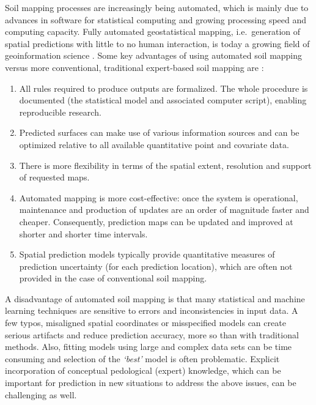 \documentclass[11pt]{krantz}
\theoremstyle{definition}
\theoremstyle{definition}
\theoremstyle{definition}
\theoremstyle{remark}
\begin{document}
Soil mapping processes are increasingly being automated, which is mainly
due to advances in software for statistical computing and growing
processing speed and computing capacity. Fully automated geostatistical
mapping, i.e.~generation of spatial predictions with little to no human
interaction, is today a growing field of geoinformation science
\citep{Pebesma2011CompGeoSci, Brown2014JSS, Hengl2014SoilGrids1km}. Some
key advantages of using automated soil mapping versus more conventional,
traditional expert-based soil mapping are
\citep{heuvelink2010implications, Bivand2013Springer}:

\begin{enumerate}
\def\labelenumi{\arabic{enumi}.}
\item
  All rules required to produce outputs are formalized. The whole
  procedure is documented (the statistical model and associated computer
  script), enabling reproducible research.
\item
  Predicted surfaces can make use of various information sources and can
  be optimized relative to all available quantitative point and
  covariate data.
\item
  There is more flexibility in terms of the spatial extent, resolution
  and support of requested maps.
\item
  Automated mapping is more cost-effective: once the system is
  operational, maintenance and production of updates are an order of
  magnitude faster and cheaper. Consequently, prediction maps can be
  updated and improved at shorter and shorter time intervals.
\item
  Spatial prediction models typically provide quantitative measures of
  prediction uncertainty (for each prediction location), which are often
  not provided in the case of conventional soil mapping.
\end{enumerate}

A disadvantage of automated soil mapping is that many statistical and
machine learning techniques are sensitive to errors and inconsistencies
in input data. A few typos, misaligned spatial coordinates or
misspecified models can create serious artifacts and reduce prediction
accuracy, more so than with traditional methods. Also, fitting models
using large and complex data sets can be time consuming and selection of
the \emph{`best'} model is often problematic. Explicit incorporation of
conceptual pedological (expert) knowledge, which can be important for
prediction in new situations to address the above issues, can be
challenging as well.
\end{document}
